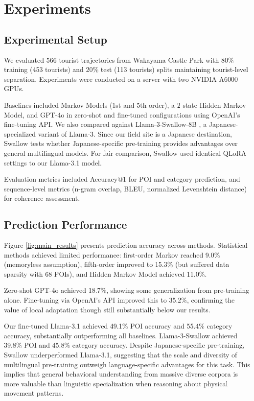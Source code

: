 \documentclass[letterpaper]{article}
\begin{document}
\section{Experiments}

\subsection{Experimental Setup}

We evaluated 566 tourist trajectories from Wakayama Castle Park with 80\% training (453 tourists) and 20\% test (113 tourists) splits maintaining tourist-level separation. Experiments were conducted on a server with two NVIDIA A6000 GPUs.

Baselines included Markov Models (1st and 5th order), a 2-state Hidden Markov Model, and GPT-4o in zero-shot and fine-tuned configurations using OpenAI's fine-tuning API. We also compared against Llama-3-Swallow-8B \cite{Okazaki:COLM2024}, a Japanese-specialized variant of Llama-3. Since our field site is a Japanese destination, Swallow tests whether Japanese-specific pre-training provides advantages over general multilingual models. For fair comparison, Swallow used identical QLoRA settings to our Llama-3.1 model.

Evaluation metrics included Accuracy@1 for POI and category prediction, and sequence-level metrics (n-gram overlap, BLEU, normalized Levenshtein distance) for coherence assessment.

\subsection{Prediction Performance}

Figure \ref{fig:main_results} presents prediction accuracy across methods. Statistical methods achieved limited performance: first-order Markov reached 9.0\% (memoryless assumption), fifth-order improved to 15.3\% (but suffered data sparsity with 68 POIs), and Hidden Markov Model achieved 11.0\%.

Zero-shot GPT-4o achieved 18.7\%, showing some generalization from pre-training alone. Fine-tuning via OpenAI's API improved this to 35.2\%, confirming the value of local adaptation though still substantially below our results.

Our fine-tuned Llama-3.1 achieved 49.1\% POI accuracy and 55.4\% category accuracy, substantially outperforming all baselines. Llama-3-Swallow achieved 39.8\% POI and 45.8\% category accuracy. Despite Japanese-specific pre-training, Swallow underperformed Llama-3.1, suggesting that the scale and diversity of multilingual pre-training outweigh language-specific advantages for this task. This implies that general behavioral understanding from massive diverse corpora is more valuable than linguistic specialization when reasoning about physical movement patterns.
\end{document}
